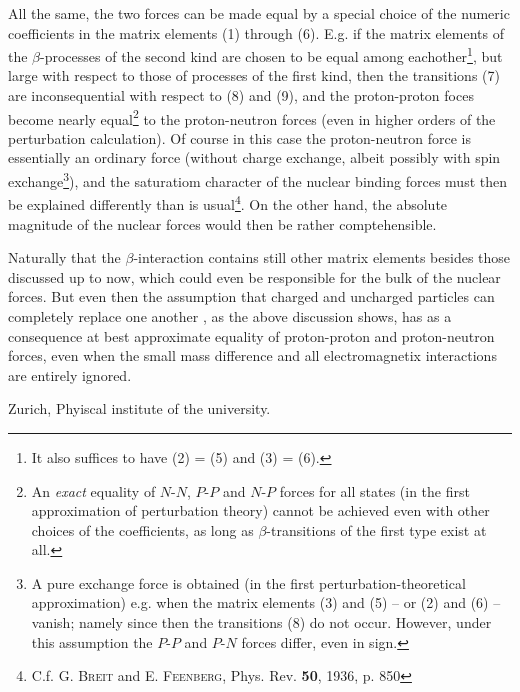 \documentclass{article}
\begin{document}
All the same, the two forces can be made equal by a special choice of the numeric coefficients in the matrix elements (1) through (6). E.g. if the matrix elements of the $\beta$-processes of the second kind are chosen to be equal among eachother\footnote{It also suffices to have (2) = (5) and (3) = (6).}, but large with respect to those of processes of the first kind, then the transitions (7) are inconsequential with respect to (8) and (9), and the proton-proton foces become nearly equal\footnote{An \textit{exact} equality of $N$-$N$, $P$-$P$ and $N$-$P$ forces for all states (in the first approximation of perturbation theory) cannot be achieved even with other choices of the coefficients, as long as $\beta$-transitions of the first type exist at all.} to the proton-neutron forces (even in higher orders of the perturbation calculation). Of course in this case the proton-neutron force is essentially an ordinary force (without charge exchange, albeit possibly with spin exchange\footnote{A pure exchange force is obtained (in the first perturbation-theoretical approximation) e.g. when the matrix elements (3) and (5) -- or (2) and (6) -- vanish; namely since then the transitions (8) do not occur. However, under this assumption the $P$-$P$ and $P$-$N$ forces differ, even in sign.}), and the saturatiom character of the nuclear binding forces must then be explained differently than is usual\footnote{C.f. \textsc{G. Breit} and \textsc{E. Feenberg}, Phys. Rev. \textbf{50}, 1936, p. 850}. On the other hand, the absolute magnitude of the nuclear forces would then be rather comptehensible.

Naturally  that the $\beta$-interaction contains still other matrix elements besides those discussed up to now, which could even be responsible for the bulk of the nuclear forces. But even then the assumption that charged and uncharged particles can completely replace one another , as the above discussion shows, has as a consequence at best approximate equality of proton-proton and proton-neutron forces, even when the small mass difference and all electromagnetix interactions are entirely ignored.

Zurich, Phyiscal institute of the university.
\end{document}
